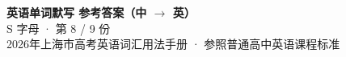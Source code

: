 \documentclass[10pt,a4paper]{article}
\begin{document}
\pagestyle{plain}

\begin{center}
{\LARGE\bfseries 英语单词默写 \quad 参考答案（中 $\to$ 英）}\\[0.22em]
{\large S 字母 · 第 8 / 9 份}\\[0.18em]
{\small 2026年上海市高考英语词汇用法手册 · 参照普通高中英语课程标准}
\end{center}

\vspace{0.2em}
\noindent{\color{rulegray}\rule{\textwidth}{0.8pt}}

\vspace{0.35em}

\vspace{0.25em}
\renewcommand{\arraystretch}{1.32}
\end{document}
